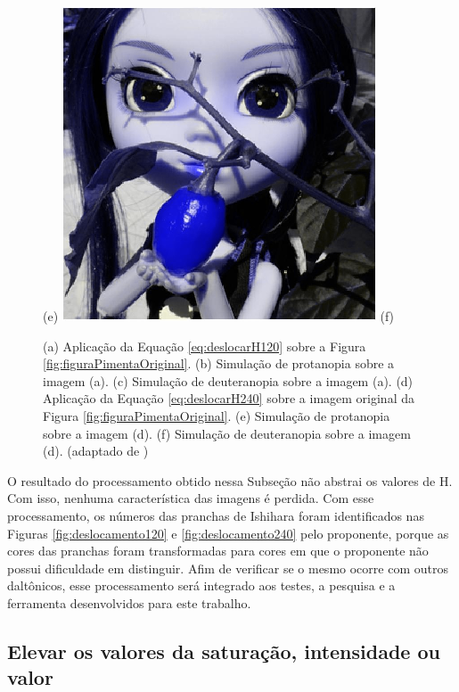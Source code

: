 \documentclass[	12pt, Times, openright, twoside, a4paper, english, brazil]{abntex2}
\begin{document}
\begin{figure}[!htb]
(e)
\endminipage\hfill
{}
\centering
{\includegraphics[width=\linewidth]{figuraPimenta240Deutran.png}}
(f)
\endminipage\hfill
\caption{
(a) Aplicação da Equação \ref{eq:deslocarH120} sobre a Figura \ref{fig:figuraPimentaOriginal}. (b) Simulação de protanopia sobre a imagem (a). (c) Simulação de deuteranopia sobre a imagem (a). (d) Aplicação da Equação \ref{eq:deslocarH240} sobre a imagem original da Figura \ref{fig:figuraPimentaOriginal}. (e) Simulação de protanopia sobre a imagem (d).
(f) Simulação de deuteranopia sobre a imagem (d). (adaptado de )}
\label{fig:figuraSimulacaoH}
\end{figure}

O resultado do processamento obtido nessa Subseção não abstrai os valores de H. Com isso, nenhuma característica das imagens é perdida. Com esse processamento, os números das pranchas de Ishihara foram identificados nas Figuras \ref{fig:deslocamento120} e \ref{fig:deslocamento240} pelo proponente, porque as cores das pranchas foram transformadas para cores em que o proponente não possui dificuldade em distinguir. Afim de verificar se o mesmo ocorre com outros daltônicos, esse processamento será integrado aos testes, a pesquisa e a ferramenta desenvolvidos para este trabalho.

\subsection{Elevar os valores da saturação, intensidade ou valor}
\label{subsec:deslocarVouI}
\end{document}
